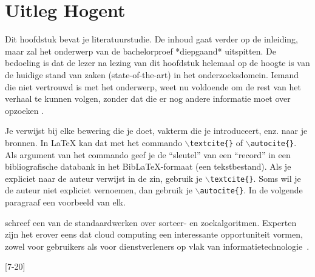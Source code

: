 \section{{Uitleg Hogent}}
Dit hoofdstuk bevat je literatuurstudie. De inhoud gaat verder op de inleiding, maar zal het onderwerp van de bachelorproef *diepgaand* uitspitten. De bedoeling is dat de lezer na lezing van dit hoofdstuk helemaal op de hoogte is van de huidige stand van zaken (state-of-the-art) in het onderzoeksdomein. Iemand die niet vertrouwd is met het onderwerp, weet nu voldoende om de rest van het verhaal te kunnen volgen, zonder dat die er nog andere informatie moet over opzoeken \autocite{Pollefliet2011}.

Je verwijst bij elke bewering die je doet, vakterm die je introduceert, enz. naar je bronnen. In \LaTeX{} kan dat met het commando \texttt{$\backslash${textcite\{\}}} of \texttt{$\backslash${autocite\{\}}}. Als argument van het commando geef je de ``sleutel'' van een ``record'' in een bibliografische databank in het Bib\LaTeX{}-formaat (een tekstbestand). Als je expliciet naar de auteur verwijst in de zin, gebruik je \texttt{$\backslash${}textcite\{\}}.
Soms wil je de auteur niet expliciet vernoemen, dan gebruik je \texttt{$\backslash${}autocite\{\}}. In de volgende paragraaf een voorbeeld van elk.
\textcite{Lusignan2014} \textcite{ronnie}

\textcite{Knuth1998} schreef een van de standaardwerken over sorteer- en zoekalgoritmen. Experten zijn het erover eens dat cloud computing een interessante opportuniteit vormen, zowel voor gebruikers als voor dienstverleners op vlak van informatietechnologie~\autocite{Creeger2009}.

[7-20]
